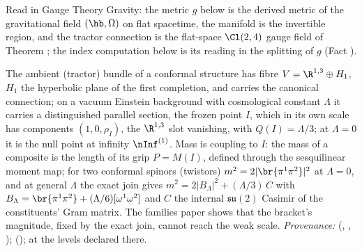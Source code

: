 Read in Gauge Theory Gravity: the metric $g$ below is the derived metric of the gravitational field $(\hb, \Omega)$ on flat spacetime, the manifold is the invertible region, and the tractor connection is the flat-space $\Cl(2,4)$ gauge field of Theorem ; the index computation below is its reading in the splitting of $g$ (Fact ).

The ambient (tractor) bundle of a conformal structure has fibre $V = \R^{1,3} \oplus H_{1}$, $H_{1}$ the hyperbolic plane of the first completion, and carries the canonical connection; on a vacuum Einstein background with cosmological constant $\Lambda$ it carries a distinguished parallel section, the frozen point $I$, which in its own scale has components $(1, 0, \rho_{I})$, the $\R^{1,3}$ slot vanishing, with $Q(I) = \Lambda/3$; at $\Lambda = 0$ it is the null point at infinity $\nInf^{(1)}$. Mass is coupling to $I$: the mass of a composite is the length of its grip $P = M(I)$, defined through the sesquilinear moment map; for two conformal spinors (twistors) $m^{2} = 2|\br{\pi^{1}\pi^{2}}|^{2}$ at $\Lambda = 0$, and at general $\Lambda$ the exact join gives $m^{2} = 2|B_{\Lambda}|^{2} + (\Lambda/3)\,C$ with $B_{\Lambda} = \br{\pi^{1}\pi^{2}} + (\Lambda/6)[\omega^{1}\omega^{2}]$ and $C$ the internal $\mathfrak{su}(2)$ Casimir of the constituents' Gram matrix. The families paper shows that the bracket's magnitude, fixed by the exact join, cannot reach the weak scale. \emph{Provenance:} \cite[Fact~2.1, Def.~5.4, Prop.~4.1, Thm.~5.6]{ButlerT11} (, , ); \cite[Prop.~4.3]{ButlerT13} (); at the levels declared there.
